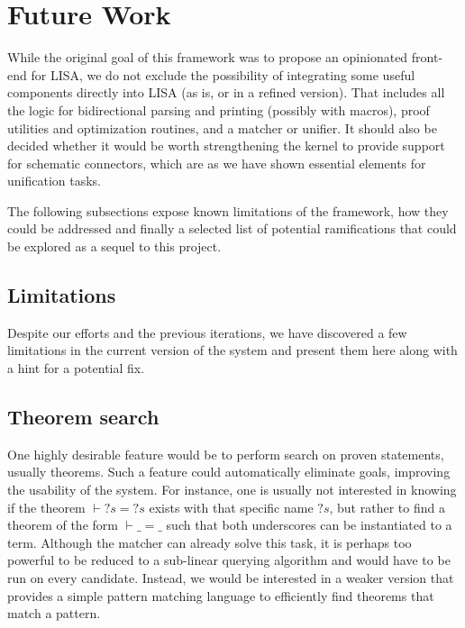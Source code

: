 \section{Future Work}
\label{sec:future-work}

While the original goal of this framework was to propose an opinionated front-end for LISA, we do not exclude the possibility of integrating some useful components directly into LISA (as is, or in a refined version). That includes all the logic for bidirectional parsing and printing (possibly with macros), proof utilities and optimization routines, and a matcher or unifier. It should also be decided whether it would be worth strengthening the kernel to provide support for schematic connectors, which are as we have shown essential elements for unification tasks.

The following subsections expose known limitations of the framework, how they could be addressed and finally a selected list of potential ramifications that could be explored as a sequel to this project.

\subsection{Limitations}

Despite our efforts and the previous iterations, we have discovered a few limitations in the current version of the system and present them here along with a hint for a potential fix.



% 

\subsection{Theorem search}

One highly desirable feature would be to perform search on proven statements, usually theorems. Such a feature could automatically eliminate goals, improving the usability of the system. For instance, one is usually not interested in knowing if the theorem $\vdash {?s} = {?s}$ exists with that specific name ${?s}$, but rather to find a theorem of the form $\vdash \_ = \_$ such that both underscores can be instantiated to a term. Although the matcher can already solve this task, it is perhaps too powerful to be reduced to a sub-linear querying algorithm and would have to be run on every candidate. Instead, we would be interested in a weaker version that provides a simple pattern matching language to efficiently find theorems that match a pattern.
